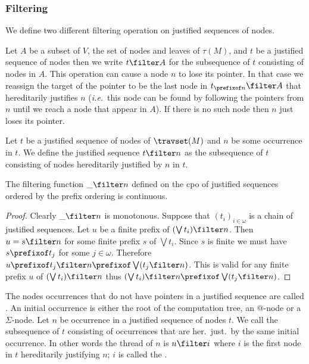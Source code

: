 \subsubsection{Filtering}

We define two different filtering operation on justified sequences of nodes.

Let $A$ be a subset of $V$, the set of nodes and leaves of $\tau(M)$, and $t$ be a justified sequence of nodes then we write $t\filter A$ for the subsequence of $t$ consisting of nodes in $A$.
This operation can cause a node $n$ to lose its pointer. In that case we reassign the target of the pointer to be the last node
in $t_{\prefixof n}\filter A$ that hereditarily justifies $n$ ({\it i.e.}\ this node can be found by following the pointers from $n$ until we reach a node that appear in $A$). If there is no such node then $n$ just loses its pointer.


\begin{definition}
Let $t$ be a justified sequence of nodes of $\travset(M)$ and
$n$ be some occurrence in $t$. We define the justified sequence $t \filter n$ as the subsequence of $t$ consisting of nodes hereditarily justified by $n$ in $t$.
\end{definition}

\begin{lemma}
\label{lem:filtercontinous}
The filtering function $\_ \filter n$ defined on the cpo of justified sequences ordered by the prefix ordering is continuous.
\end{lemma}
\begin{proof}
Clearly $\_ \filter n$ is monotonous.
Suppose that $(t_i)_{i\in\omega}$ is a chain of justified sequences. Let $u$ be a finite prefix of $(\bigvee t_i) \filter n$.
Then $u = s \filter n$ for some finite prefix $s$ of $\bigvee t_i$. Since $s$ is finite we must have $s \prefixof t_j$ for some $j\in\omega$.
Therefore $u \prefixof t_j \filter n \prefixof \bigvee (t_j \filter  n)$.
This is valid for any finite prefix $u$ of $(\bigvee t_i) \filter n$ thus $(\bigvee t_i) \filter  n \prefixof \bigvee (t_j \filter n)$.
\end{proof}


The nodes occurrences that do not have pointers in a justified
sequence are called . An initial
occurrence is either the root of the computation tree,
an @-node or a $\Sigma$-node. Let $n$ be occurrence in a justified
sequence of nodes $t$. We call
 the subsequence of $t$
consisting of occurrences that are her.\ just.\ by the same initial
occurrence. In other words the thread of $n$ is $n \filter i$ where
$i$ is the first node in $t$ hereditarily justifying $n$; $i$ is
called the .

